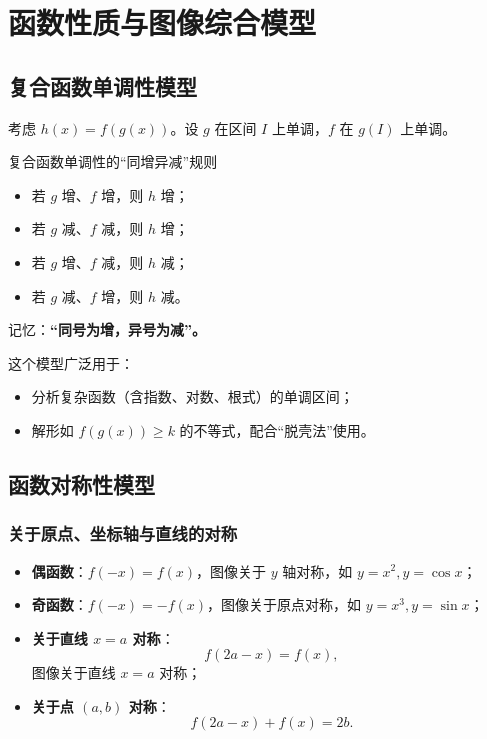 \documentclass[a4paper,11pt]{ctexart}
\begin{document}
\section{函数性质与图像综合模型}

\subsection{复合函数单调性模型}

考虑 $h(x)=f(g(x))$。设 $g$ 在区间 $I$ 上单调，$f$ 在 $g(I)$ 上单调。

\begin{summarybox}[mathnote coverage=line]{复合函数单调性的“同增异减”规则}
  \begin{itemize}
    \item 若 $g$ 增、$f$ 增，则 $h$ 增；
    \item 若 $g$ 减、$f$ 减，则 $h$ 增；
    \item 若 $g$ 增、$f$ 减，则 $h$ 减；
    \item 若 $g$ 减、$f$ 增，则 $h$ 减。
  \end{itemize}
  记忆：\textbf{“同号为增，异号为减”。}
\end{summarybox}

这个模型广泛用于：

\begin{itemize}
  \item 分析复杂函数（含指数、对数、根式）的单调区间；
  \item 解形如 $f(g(x))\ge k$ 的不等式，配合“脱壳法”使用。
\end{itemize}

\subsection{函数对称性模型}

\subsubsection{关于原点、坐标轴与直线的对称}

\begin{itemize}
  \item \textbf{偶函数}：$f(-x)=f(x)$，图像关于 $y$ 轴对称，如 $y=x^2, y=\cos x$；
  \item \textbf{奇函数}：$f(-x)=-f(x)$，图像关于原点对称，如 $y=x^3,y=\sin x$；
  \item \textbf{关于直线 $x=a$ 对称}：
    \[
      f(2a-x)=f(x),
    \]
    图像关于直线 $x=a$ 对称；
  \item \textbf{关于点 $(a,b)$ 对称}：
    \[
      f(2a-x)+f(x)=2b.
    \]
\end{itemize}
\end{document}
